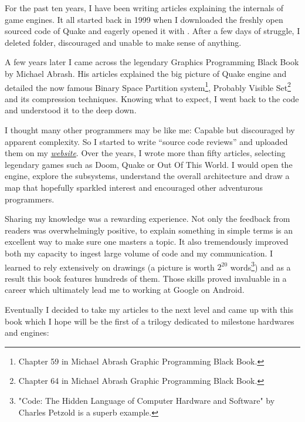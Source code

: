 \documentclass[book.tex]{subfiles}
\begin{document}
For the past ten years, I have been writing articles explaining the internals of game engines. It all started back in 1999 when I downloaded the freshly open sourced code of \mbox{Quake} and eagerly opened it with . After a few days of struggle, I deleted  folder, discouraged and unable to make sense of anything.

\bigskip

A few years later I came across the legendary Graphics Programming Black Book by Michael Abrash. His articles explained the big picture of Quake engine and detailed the now famous Binary Space Partition system\footnote{Chapter 59 in Michael Abrash Graphic Programming Black Book.}, Probably Visible Set\footnote{Chapter 64 in Michael Abrash Graphic Programming Black Book.} and its compression techniques. Knowing what to expect, I went back to the code and understood it to the deep down.

\bigskip

I thought many other programmers may be like me: Capable but discouraged by apparent complexity. So I started to write ``source  code reviews'' and uploaded them on my
\href{http://fabiensanglard.net}{\textit{website}}. Over the years, I wrote more than fifty articles, selecting legendary games such as Doom, Quake or Out Of This World. I would open the engine, explore the subsystems, understand the overall architecture and draw a map that hopefully sparkled interest and encouraged other adventurous programmers.

\bigskip

Sharing my knowledge was a rewarding experience. Not only the feedback from readers was overwhelmingly positive, to explain something in simple terms is an excellent way to make sure one masters a topic. It also tremendously improved both my capacity to ingest large volume of code and my communication. I learned to rely extensively on drawings (a picture is worth $2^{20}$ words\footnote{"Code: The Hidden Language of Computer Hardware and Software" by Charles Petzold is a superb example.}) and as a result this book features hundreds of them. Those skills proved invaluable in a career which ultimately lead me to working at Google on Android.

\newpage

Eventually I decided to take my articles to the next level and came up with this book which I hope will be the first of a trilogy dedicated to milestone hardwares and engines:
\end{document}

